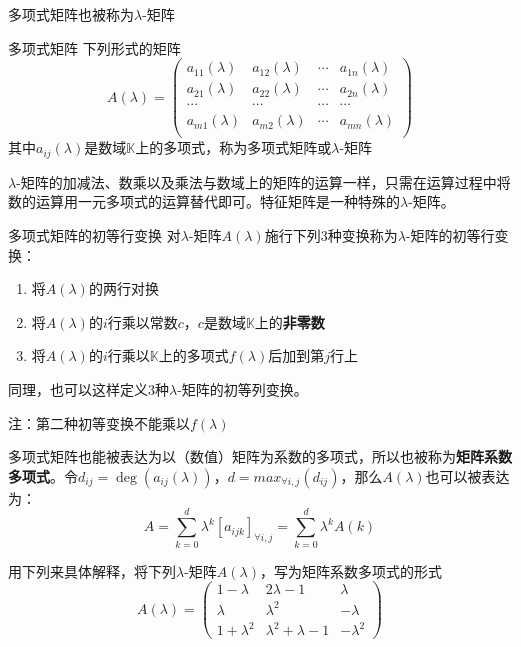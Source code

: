 多项式矩阵也被称为$\lambda$-矩阵

\begin{definition}{多项式矩阵}
下列形式的矩阵
$$A(\lambda)=\begin{pmatrix}
a_{11}(\lambda) & a_{12}(\lambda) & \cdots & a_{1n}(\lambda) \\
a_{21}(\lambda) & a_{22}(\lambda) & \cdots & a_{2n}(\lambda) \\
\cdots          & \cdots          & \cdots & \cdots          \\
a_{m1}(\lambda) & a_{m2}(\lambda) & \cdots & a_{mn}(\lambda) \\
\end{pmatrix}$$
其中$a_{ij}(\lambda)$是数域$\mathbb{K}$上的多项式，称为多项式矩阵或$\lambda$-矩阵
\end{definition}


$\lambda$-矩阵的加减法、数乘以及乘法与数域上的矩阵的运算一样，只需在运算过程中将数的运算用一元多项式的运算替代即可。特征矩阵是一种特殊的$\lambda$-矩阵。

\begin{definition}{多项式矩阵的初等行变换}
对$\lambda$-矩阵$A(\lambda)$施行下列3种变换称为$\lambda$-矩阵的初等行变换：
\begin{enumerate}
\item 将$A(\lambda)$的两行对换
\item 将$A(\lambda)$的$i$行乘以常数$c$，$c$是数域$\mathbb{K}$上的\textbf{非零数}
\item 将$A(\lambda)$的$i$行乘以$\mathbb{K}$上的多项式$f(\lambda)$后加到第$j$行上
\end{enumerate}
同理，也可以这样定义3种$\lambda$-矩阵的初等列变换。
\end{definition}

注：第二种初等变换不能乘以$f(\lambda)$

多项式矩阵也能被表达为以（数值）矩阵为系数的多项式，所以也被称为\textbf{矩阵系数多项式}。令$d_{ij}=\deg(a_{ij}(\lambda))$，$d=max_{\forall{i,j}}(d_{ij})$，那么$A(\lambda)$也可以被表达为：
\begin{equation}
A=\sum_{k=0}^d\lambda^k[a_{ijk}]_{\forall{i,j}}=\sum_{k=0}^d\lambda^kA(k)
\end{equation}

用下列来具体解释，将下列$\lambda$-矩阵$A(\lambda)$，写为矩阵系数多项式的形式
\begin{equation}
A(\lambda)=
\begin{pmatrix}
1-\lambda   & 2\lambda-1 & \lambda \\
\lambda     & \lambda^2  & -\lambda\\
1+\lambda^2 & \lambda^2+\lambda-1 & -\lambda^2
\end{pmatrix}
\end{equation}

